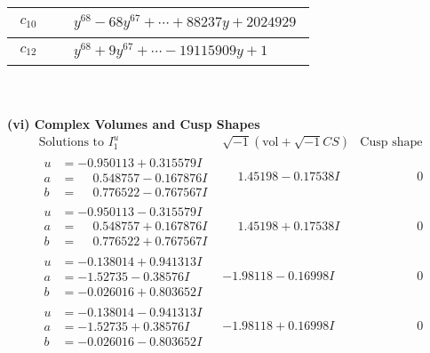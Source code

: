 \documentclass[1p]{elsarticle_modified}
\theoremstyle{definition}
\newcommand{\I}{\sqrt{-1}}
\begin{document}
\begin{tabular}{m{50pt}|m{274pt}}
\hline $$\begin{aligned}c_{10}\end{aligned}$$&$\begin{aligned}
&y^{68}-68 y^{67}+\cdots+88237 y+2024929
\end{aligned}$\\
\hline $$\begin{aligned}c_{12}\end{aligned}$$&$\begin{aligned}
&y^{68}+9 y^{67}+\cdots-19115909 y+1
\end{aligned}$\\
\hline
\end{tabular}\\~\\
\newpage\flushleft \textbf{(vi) Complex Volumes and Cusp Shapes}
$$\begin{array}{c|c|c}  
\text{Solutions to }I^u_{1}& \I (\text{vol} + \sqrt{-1}CS) & \text{Cusp shape}\\
 \hline 
\begin{aligned}
u &= -0.950113 + 0.315579 I \\
a &= \phantom{-}0.548757 - 0.167876 I \\
b &= \phantom{-}0.776522 - 0.767567 I\end{aligned}
 & \phantom{-}1.45198 - 0.17538 I & \phantom{-0.000000 } 0 \\ \hline\begin{aligned}
u &= -0.950113 - 0.315579 I \\
a &= \phantom{-}0.548757 + 0.167876 I \\
b &= \phantom{-}0.776522 + 0.767567 I\end{aligned}
 & \phantom{-}1.45198 + 0.17538 I & \phantom{-0.000000 } 0 \\ \hline\begin{aligned}
u &= -0.138014 + 0.941313 I \\
a &= -1.52735 - 0.38576 I \\
b &= -0.026016 + 0.803652 I\end{aligned}
 & -1.98118 - 0.16998 I & \phantom{-0.000000 } 0 \\ \hline\begin{aligned}
u &= -0.138014 - 0.941313 I \\
a &= -1.52735 + 0.38576 I \\
b &= -0.026016 - 0.803652 I\end{aligned}
 & -1.98118 + 0.16998 I & \phantom{-0.000000 } 0 \\ \hline\begin{aligned}

\end{aligned}
\end{array}$$
\end{document}
